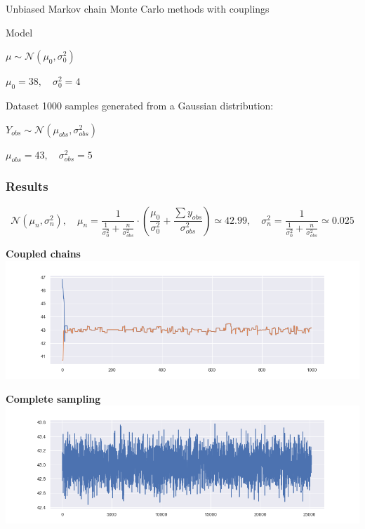 \documentclass{beamer}
\begin{document}
\begin{section}{Unbiased Markov chain Monte Carlo methods with couplings}
\begin{frame}
\begin{block}{Model}
\begin{center}
				$ \mu  \sim \mathcal{N}(\mu_0, \sigma_0^2)$
				
				$\mu_0 = 38, \quad \sigma^2_0 = 4$
			\end{center}
		\end{block}
		
		\begin{block}{Dataset}
			1000 samples generated from a Gaussian distribution:
			\begin{center}
				$
				Y_{obs} \sim \mathcal{N}(\mu_{obs}, \sigma_{obs} ^2)
				$
				
				$
				\mu_{obs} = 43, \quad
				\sigma_{obs} ^2 = 5
				$
			\end{center}
		\end{block}
	\end{frame}

	\begin{frame}
		\frametitle{Results}
		
		{\small
			$$
				\mathcal{N}(\mu_n, \sigma^2_n), 
				\quad
				\mu_n 
					= \frac{1}{ \frac{1}{\sigma_0^2} + \frac{n}{\sigma_{obs}^2} } 
					\cdot \left(\frac{\mu_0}{\sigma_0^2} + \frac{\sum y_{obs}}{\sigma_{obs}^2}\right)
					\simeq 42.99,
				\quad
				\sigma^2_n
					= \frac{1}{ \frac{1}{\sigma_0^2} + \frac{n}{\sigma_{obs}^2} } 
					\simeq 0.025
		$$
		}
	
		\begin{minipage}{0.48\textwidth}
			\begin{center}
				{\scriptsize \textbf{Coupled chains} }
				\includegraphics[width=\textwidth]{img/mcmc_coupling_chain_meeting}
			\end{center}
		\end{minipage}
		\hfill
		\begin{minipage}{0.48\textwidth}
			\begin{center}
				{\scriptsize \textbf{Complete sampling}}
				\includegraphics[width=\textwidth]{img/mcmc_coupling_sampling}
			\end{center}
		\end{minipage}
	

\end{frame}
\end{section}
\end{document}
